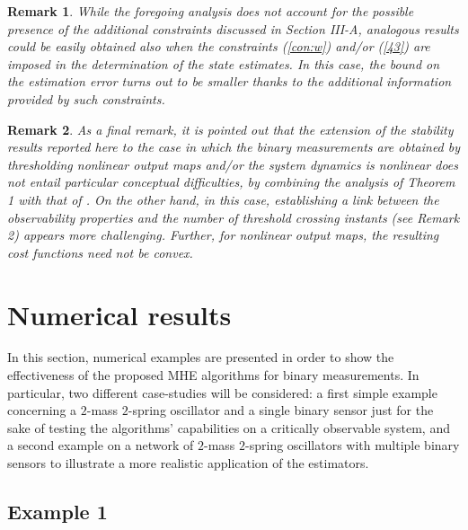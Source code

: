 \documentclass[11pt,journal,onecolumn]{IEEEtran}
\newtheorem{remark}{Remark}
\begin{document}
\begin{remark}
While the foregoing analysis does not account for the possible presence of the additional constraints discussed in Section III-A, analogous results could be easily obtained also when the constraints (\ref{con:w}) and/or (\ref{43}) are imposed in the determination of the state estimates. In this case, the bound on the estimation error turns out to be smaller thanks to the additional information provided by such constraints.
\end{remark}

\begin{remark}
As a final remark, it is pointed out that the extension of the stability results reported here to the case in which the binary measurements are obtained by thresholding nonlinear output maps and/or the system dynamics is nonlinear does not entail particular conceptual difficulties, by combining the analysis of Theorem 1 with that of \cite{NLMHE,AlBaBaZavCDC10}. On the other hand, in this case, establishing a link between the observability properties and the number of threshold crossing instants (see Remark 2) appears more challenging. Further, for nonlinear output maps, the resulting cost functions need not be convex.
\end{remark}

\section{Numerical results}

In this section, numerical examples are presented in order to show the effectiveness of the proposed MHE algorithms for binary measurements.
In particular, two different case-studies will be considered: a first simple example concerning a $2$-mass $2$-spring oscillator and a single binary sensor just for the sake of testing the algorithms' capabilities on a critically observable system, and a second example on a network of $2$-mass $2$-spring oscillators with multiple binary sensors to illustrate a more realistic application of the estimators.

\subsection*{Example 1}
\end{document}
